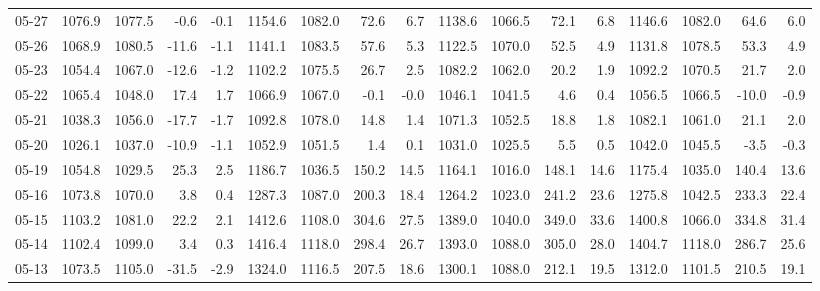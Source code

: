 \begin{threeparttable}
{\begin{tabular}{lrrrrrrrrrrrrrrrr}
  05-27 & 1076.9 & 1077.5 &       -0.6 &           -0.1 & 1154.6 & 1082.0 &       72.6 &            6.7 & 1138.6 & 1066.5 &       72.1 &            6.8 & 1146.6 & 1082.0 &        64.6 &              6.0 \\
  05-26 & 1068.9 & 1080.5 &      -11.6 &           -1.1 & 1141.1 & 1083.5 &       57.6 &            5.3 & 1122.5 & 1070.0 &       52.5 &            4.9 & 1131.8 & 1078.5 &        53.3 &              4.9 \\
  05-23 & 1054.4 & 1067.0 &      -12.6 &           -1.2 & 1102.2 & 1075.5 &       26.7 &            2.5 & 1082.2 & 1062.0 &       20.2 &            1.9 & 1092.2 & 1070.5 &        21.7 &              2.0 \\
  05-22 & 1065.4 & 1048.0 &       17.4 &            1.7 & 1066.9 & 1067.0 &       -0.1 &           -0.0 & 1046.1 & 1041.5 &        4.6 &            0.4 & 1056.5 & 1066.5 &       -10.0 &             -0.9 \\
  05-21 & 1038.3 & 1056.0 &      -17.7 &           -1.7 & 1092.8 & 1078.0 &       14.8 &            1.4 & 1071.3 & 1052.5 &       18.8 &            1.8 & 1082.1 & 1061.0 &        21.1 &              2.0 \\
  05-20 & 1026.1 & 1037.0 &      -10.9 &           -1.1 & 1052.9 & 1051.5 &        1.4 &            0.1 & 1031.0 & 1025.5 &        5.5 &            0.5 & 1042.0 & 1045.5 &        -3.5 &             -0.3 \\
  05-19 & 1054.8 & 1029.5 &       25.3 &            2.5 & 1186.7 & 1036.5 &      150.2 &           14.5 & 1164.1 & 1016.0 &      148.1 &           14.6 & 1175.4 & 1035.0 &       140.4 &             13.6 \\
  05-16 & 1073.8 & 1070.0 &        3.8 &            0.4 & 1287.3 & 1087.0 &      200.3 &           18.4 & 1264.2 & 1023.0 &      241.2 &           23.6 & 1275.8 & 1042.5 &       233.3 &             22.4 \\
  05-15 & 1103.2 & 1081.0 &       22.2 &            2.1 & 1412.6 & 1108.0 &      304.6 &           27.5 & 1389.0 & 1040.0 &      349.0 &           33.6 & 1400.8 & 1066.0 &       334.8 &             31.4 \\
  05-14 & 1102.4 & 1099.0 &        3.4 &            0.3 & 1416.4 & 1118.0 &      298.4 &           26.7 & 1393.0 & 1088.0 &      305.0 &           28.0 & 1404.7 & 1118.0 &       286.7 &             25.6 \\
  05-13 & 1073.5 & 1105.0 &      -31.5 &           -2.9 & 1324.0 & 1116.5 &      207.5 &           18.6 & 1300.1 & 1088.0 &      212.1 &           19.5 & 1312.0 & 1101.5 &       210.5 &             19.1 \\

\end{tabular}}
\end{threeparttable}

